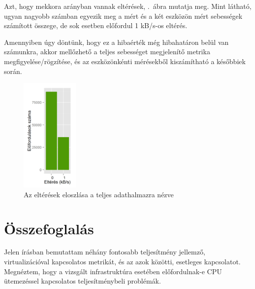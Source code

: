 \documentclass[a4paper,10pt,titlepage]{article}
\newcommand{\todo}[1]{
    \vfill
    \begingroup
        \setlength{\parindent}{0cm}
        \fcolorbox{todofrszin}{todobgszin}{
            \parbox{\textwidth}{
                \vskip10pt
                \leftskip10pt
                \rightskip10pt
            
                \emph{TODO: #1}
  
                \vskip10pt
            }
        }
    \endgroup
    \vfill
}
\begin{document}
Azt, hogy mekkora arányban vannak eltérések, .~ábra mutatja meg. Mint látható, ugyan nagyobb számban egyezik meg a mért és a két eszközön mért sebességek számított összege, de sok esetben előfordul 1 kB/s-os eltérés.

Amennyiben úgy döntünk, hogy ez a hibaérték még hibahatáron belül van számunkra, akkor mellőzhető a teljes sebességet megjelenítő metrika megfigyelése/rögzítése, és az eszközönkénti mérésekből kiszámítható a későbbiek során.

\begin{figure}[ht!]
\centering
\includegraphics[width=0.25\textwidth]{figures/net_transmitted_average_diff-dist-20120826230140-20120924083120.png}
\caption{ Az eltérések eloszlása a teljes adathalmazra nézve \label{fig:net_transmitted_average_diff-dist}}
\end{figure}


%

\section{Összefoglalás}

Jelen írásban bemutattam néhány fontosabb teljesítmény jellemző, virtualizációval kapcsolatos metrikát, és az azok közötti, esetleges kapcsolatot. Megnéztem, hogy a vizsgált infrastruktúra esetében előfordulnak-e CPU ütemezéssel kapcsolatos teljesítménybeli problémák.
\end{document}
